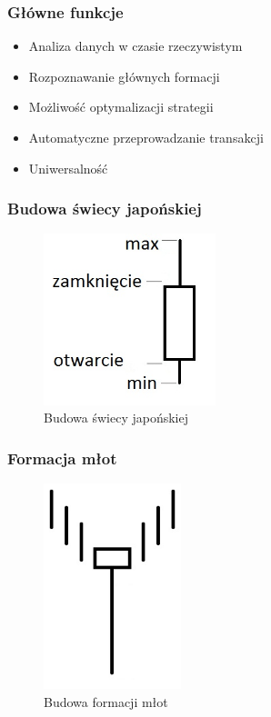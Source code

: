\documentclass{beamer}
\begin{document}

\begin{frame}
\frametitle{Główne funkcje}

\begin{itemize}

\item Analiza danych w czasie rzeczywistym
\item Rozpoznawanie głównych formacji 
\item Możliwość optymalizacji strategii
\item Automatyczne przeprowadzanie transakcji
\item Uniwersalność

\end{itemize}

\end{frame}


\begin{frame}
\frametitle{Budowa świecy japońskiej}
\begin{figure}[ht]
\begin{center}
\includegraphics[width=5cm]{candle.jpg}
\caption{Budowa świecy japońskiej}
\end{center}
\end{figure} 


\end{frame}


\begin{frame}
\frametitle{Formacja młot}
\begin{figure}[ht]
\begin{center}
\includegraphics[width=4cm]{hammer.jpg}
\caption{Budowa formacji młot}
\end{center}
\end{figure} 


\end{frame}
\end{document}
